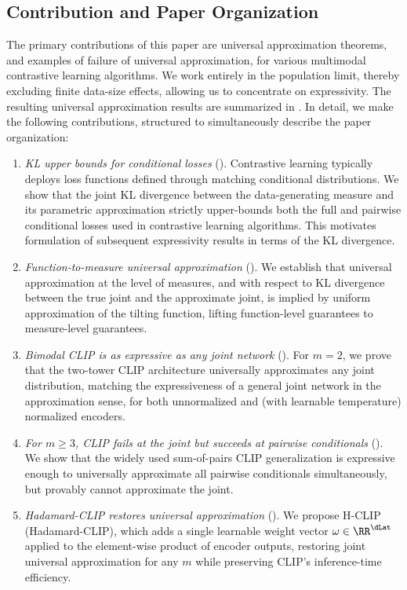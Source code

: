 \documentclass{article}
\begin{document}
\subsection{Contribution and Paper Organization} \label{ssec:CAO}
The primary contributions of this paper are universal approximation
theorems, and examples of failure of universal approximation, for various
multimodal contrastive learning algorithms. We work entirely in the
population limit, thereby excluding finite data-size effects, allowing us
to concentrate on expressivity. The resulting universal approximation
results are summarized in . In detail, we make
the following contributions, structured to simultaneously describe the
paper organization:
\begin{enumerate}[start=1,label={(C\arabic*)}]
 \item \emph{KL upper bounds for conditional losses}
       ().
       Contrastive learning typically deploys loss functions defined through matching conditional
       distributions. We show that the joint KL divergence between the data-generating measure
       and its parametric approximation strictly upper-bounds both the full
       and pairwise conditional losses used in contrastive
       learning algorithms. This motivates formulation of subsequent expressivity
       results in terms of the KL divergence.
 \item \emph{Function-to-measure universal approximation}
       ().
       We establish that universal approximation at the level of measures, and with respect to KL divergence
       between the true joint and the approximate joint, is implied by uniform approximation of the tilting function,
       lifting function-level guarantees to measure-level guarantees.
 \item \emph{Bimodal CLIP is as expressive as any joint network}
       ().
       For $m=2$, we prove that the two-tower CLIP architecture universally
       approximates any joint distribution, matching the expressiveness of a
       general joint network in the approximation sense, for both
       unnormalized and (with learnable temperature) normalized encoders.
 \item \emph{For $m \geq 3$, CLIP fails at the joint but succeeds at pairwise
        conditionals} ().
       We show that the widely used sum-of-pairs CLIP generalization
       is expressive enough to
       universally approximate all pairwise conditionals simultaneously,
       but provably cannot approximate the joint.
 \item \emph{Hadamard-CLIP restores universal approximation}
       ().
       We propose H-CLIP (Hadamard-CLIP), which adds a single learnable weight
       vector $\omega \in \RR^{\dLat}$ applied to the element-wise product of
       encoder outputs, restoring joint universal approximation for any $m$
       while preserving CLIP's inference-time efficiency.
\end{enumerate}
\end{document}
